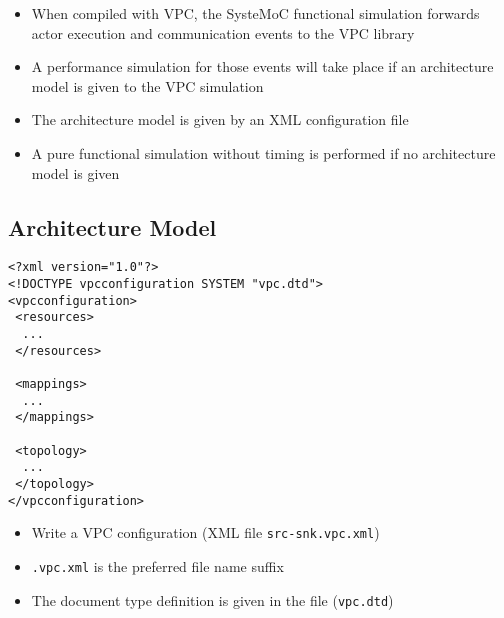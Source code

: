 \begin{frame}[fragile=singleslide]
\begin{itemize}
\item When compiled with VPC, the SysteMoC functional simulation forwards actor execution and communication events to the VPC library
\item A performance simulation for those events will take place if an architecture model is given to the VPC simulation
\item The architecture model is given by an XML configuration file
\item A pure functional simulation without timing is performed if no architecture model is given
\end{itemize}
\end{frame}


\subsection{Architecture Model}


\lstset{language=XML}
\begin{frame}[fragile=singleslide]
\begin{lstlisting}
<?xml version="1.0"?>
<!DOCTYPE vpcconfiguration SYSTEM "vpc.dtd">
<vpcconfiguration>
 <resources>
  ...
 </resources>

 <mappings>
  ...
 </mappings>

 <topology>
  ...
 </topology>
</vpcconfiguration>
\end{lstlisting}
\begin{itemize}
\item Write a VPC configuration (XML file \lstinline!src-snk.vpc.xml!)
\item \lstinline!.vpc.xml! is the preferred file name suffix
\item The document type definition is given in the file (\lstinline!vpc.dtd!)
\end{itemize}
\end{frame}


